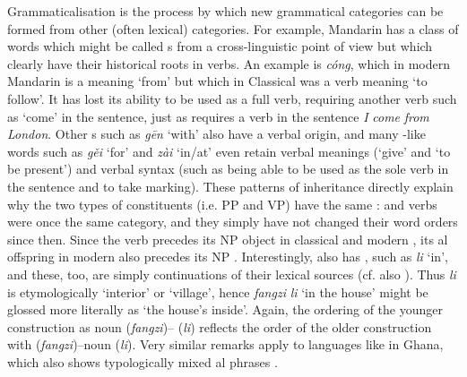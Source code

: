 \documentclass[output=paper]{langsci/langscibook}
\begin{document}
Grammaticalisation is the process by which new grammatical categories can be formed from other (often lexical) categories. For example, Mandarin  has a class of words which might be called s from a cross-linguistic point of view but which clearly have their historical roots in verbs. An example is  \textit{cóng}, which in modern Mandarin is a  meaning ‘from’ but which in Classical  was a verb meaning ‘to follow’. It has lost its ability to be used as a full verb, requiring another verb such as ‘come’ in the sentence, just as  requires a verb in the sentence \textit{I} \textit{come} \textit{from} \textit{London}. Other  s such as  \textit{gēn} ‘with’ also have a verbal origin, and many -like words such as  \textit{gěi} ‘for’ and  \textit{zài} ‘in/at’ even retain verbal meanings (‘give’ and ‘to be present’) and verbal syntax (such as being able to be used as the sole verb in the sentence and to take  marking). These patterns of inheritance directly explain why the two types of constituents (i.e. PP and VP) have the same :  and verbs were once the same category, and they simply have not changed their word orders since then. Since the verb precedes its NP object in classical and modern , its al offspring in modern  also precedes its NP . Interestingly,  also has , such as \textit{li} ‘in’, and these, too, are simply continuations of their lexical sources (cf. also ). Thus \textit{li} is etymologically ‘interior’ or ‘village’, hence \textit{fangzi} \textit{li} ‘in the house’ might be glossed more literally as ‘the house’s inside’. Again, the ordering of the younger construction as noun (\textit{fangzi})– (\textit{li}) reflects the order of the older construction with  (\textit{fangzi})–noun (\textit{li}). Very similar remarks apply to  languages like  in Ghana, which also shows typologically mixed al phrases \citep{Bodomo1997}. 
\end{document}
